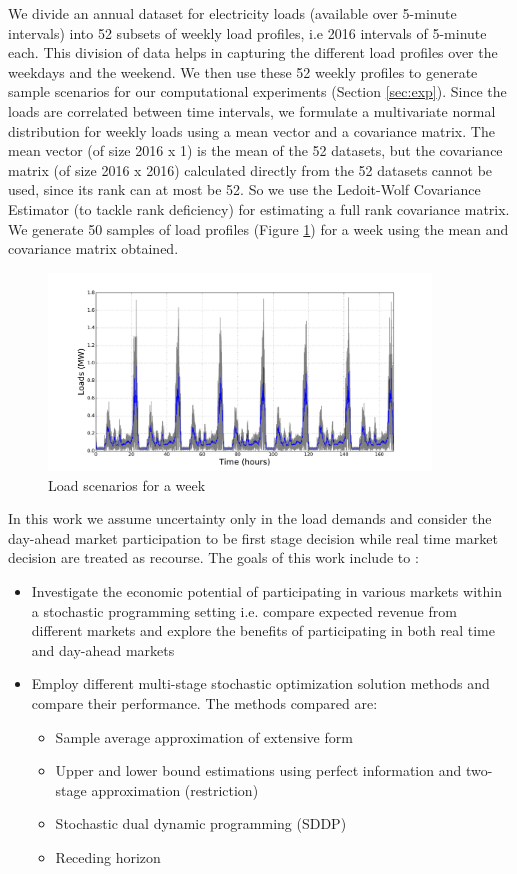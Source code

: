 \documentclass[11pt,twoside]{article}
\begin{document}
We divide an annual dataset for electricity loads (available over 5-minute intervals) into 52 subsets of weekly load profiles, i.e 2016 intervals of 5-minute each. This division of data helps in capturing the different load profiles over the weekdays and the weekend. We then use these 52 weekly profiles to generate sample scenarios for our computational experiments (Section \ref{sec:exp}). Since the loads are correlated between time intervals, we formulate a multivariate normal distribution for weekly loads using a mean vector and a covariance matrix. The mean vector (of size 2016 x 1) is the mean of the 52 datasets, but the covariance matrix (of size 2016 x 2016) calculated directly from the 52 datasets cannot be used, since its rank can at most be 52. So we use the Ledoit-Wolf Covariance Estimator \cite{ledoit2004well} (to tackle rank deficiency) for estimating a full rank covariance matrix. We generate 50 samples of load profiles (Figure \ref{fig:loads_scenarios}) for a week using the mean and covariance matrix obtained. 
\begin{figure}[h!]
\begin{center}
\includegraphics[width=4in]{Figures/Plots/fullproblem_stoch/loads_scenarios.pdf} \caption{Load scenarios for a week}\label{fig:loads_scenarios}\end{center}
\end{figure}

In this work we assume uncertainty only in the load demands and consider the day-ahead market participation to be first stage decision while real time market decision are treated as recourse. The goals of this work include to :
\begin{itemize}
\item Investigate the economic potential of participating in various markets within a stochastic programming setting i.e. compare expected revenue from different markets and explore the benefits of participating in both real time and day-ahead markets
\item Employ different multi-stage stochastic optimization solution methods and compare their performance. The methods compared are:
\begin{itemize}
\item Sample average approximation of extensive form
\item Upper and lower bound estimations using perfect information and two-stage approximation (restriction)
\item Stochastic dual dynamic programming (SDDP)
\item Receding horizon 
\end{itemize}
\end{itemize}
\end{document}

